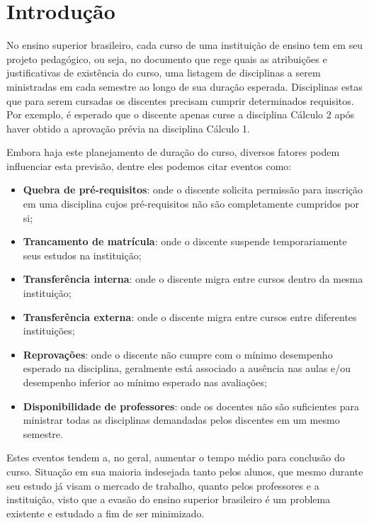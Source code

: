 \chapter{Introdução} \label{chap:introducao}

No ensino superior brasileiro, cada curso de uma instituição de ensino tem em seu projeto pedagógico, ou seja, no documento que rege quais as atribuições e justificativas de existência do curso, uma listagem de disciplinas a serem ministradas em cada semestre ao longo de sua duração esperada. Disciplinas estas que para serem cursadas os discentes precisam cumprir determinados requisitos. Por exemplo, é esperado que o discente apenas curse a disciplina Cálculo 2 após haver obtido a aprovação prévia na disciplina Cálculo 1.

Embora haja este planejamento de duração do curso, diversos fatores podem influenciar esta previsão, dentre eles podemos citar eventos como:

\begin{itemize}
  \item \textbf{Quebra de pré-requisitos}: onde o discente solicita permissão para inscrição em uma disciplina cujos pré-requisitos não são completamente cumpridos por si;
  \item \textbf{Trancamento de matrícula}: onde o discente suspende temporariamente seus estudos na instituição;
  \item \textbf{Transferência interna}: onde o discente migra entre cursos dentro da mesma instituição;
  \item \textbf{Transferência externa}: onde o discente migra entre cursos entre diferentes instituições;
  \item \textbf{Reprovações}: onde o discente não cumpre com o mínimo desempenho esperado na disciplina, geralmente está associado a ausência nas aulas e/ou desempenho inferior ao mínimo esperado nas avaliações;
  \item \textbf{Disponibilidade de professores}: onde os docentes não são suficientes para ministrar todas as disciplinas demandadas pelos discentes em um mesmo semestre.
\end{itemize}

Estes eventos tendem a, no geral, aumentar o tempo médio para conclusão do curso. Situação em sua maioria indesejada tanto pelos alunos, que mesmo durante seu estudo já visam o mercado de trabalho, quanto pelos professores e a instituição, visto que a evasão do ensino superior brasileiro é um problema existente e estudado a fim de ser minimizado.

